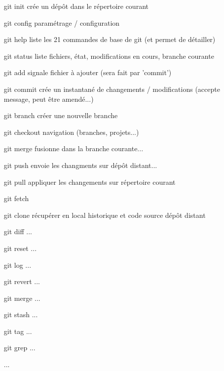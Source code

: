 \documentclass[11pt,twoside,a4paper]{article}
\begin{document}
\begin{landscape}
\begin{multicols}{2}
	\begin{itemize}
		\item[git init] cr{\'e}e un d{\'e}p{\^o}t dans le r{\'e}pertoire courant
		\item[git config] param{\'e}trage / configuration 
		\item[git help] liste les 21 commandes de base de git (et permet de d{\'e}tailler) 
		\item[git status] liste fichiers, {\'e}tat, modifications en cours, branche courante 
		\item[git add] signale fichier {\`a} ajouter (sera fait par 'commit') 
		\item[git commit] cr{\'e}e un instantan{\'e} de changements / modifications (accepte message, peut {\^e}tre amend{\'e}...) 
		\item[git branch] cr{\'e}er une nouvelle branche 
		\item[git checkout] navigation (branches, projets...) 
		\item[git merge] fusionne dans la branche courante... 
		\item[git push] envoie les changments sur d{\'e}p{\^o}t distant... 
		\item[git pull] appliquer les changements sur r{\'e}pertoire courant
		\item[git fetch] 
		\item[git clone] r{\'e}cup{\'e}rer en local historique et code source d{\'e}p{\^o}t distant 
		\item[git diff] ... 
		\item[git reset] ... 
		\item[git log] ... 
		\item[git revert] ... 
		\item[git merge] ... 
		\item[git stash] ... 
		\item[git tag] ... 
		\item[git grep] ... 
		\item[] ... 
	\end{itemize}
	
	\vfill~\\
	\columnbreak
	

\end{multicols}
\end{landscape}
\end{document}
